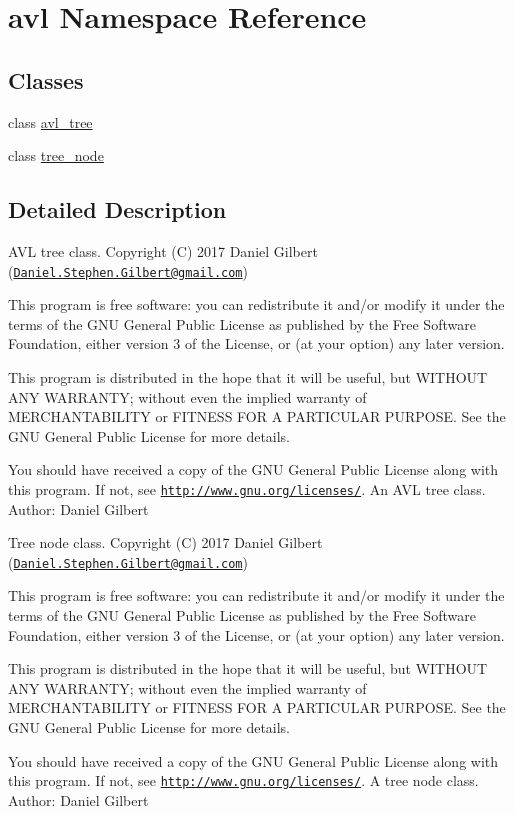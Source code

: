 \hypertarget{namespaceavl}{}\section{avl Namespace Reference}
\label{namespaceavl}
\subsection*{Classes}
\begin{DoxyCompactItemize}
\item 
class \hyperlink{classavl_1_1avl__tree}{avl\+\_\+tree}
\item 
class \hyperlink{classavl_1_1tree__node}{tree\+\_\+node}
\end{DoxyCompactItemize}


\subsection{Detailed Description}
A\+VL tree class. Copyright (C) 2017 Daniel Gilbert (\href{mailto:Daniel.Stephen.Gilbert@gmail.com}{\tt Daniel.\+Stephen.\+Gilbert@gmail.\+com})

This program is free software\+: you can redistribute it and/or modify it under the terms of the G\+NU General Public License as published by the Free Software Foundation, either version 3 of the License, or (at your option) any later version.

This program is distributed in the hope that it will be useful, but W\+I\+T\+H\+O\+UT A\+NY W\+A\+R\+R\+A\+N\+TY; without even the implied warranty of M\+E\+R\+C\+H\+A\+N\+T\+A\+B\+I\+L\+I\+TY or F\+I\+T\+N\+E\+SS F\+OR A P\+A\+R\+T\+I\+C\+U\+L\+AR P\+U\+R\+P\+O\+SE. See the G\+NU General Public License for more details.

You should have received a copy of the G\+NU General Public License along with this program. If not, see \href{http://www.gnu.org/licenses/}{\tt http\+://www.\+gnu.\+org/licenses/}. An A\+VL tree class. Author\+: Daniel Gilbert

Tree node class. Copyright (C) 2017 Daniel Gilbert (\href{mailto:Daniel.Stephen.Gilbert@gmail.com}{\tt Daniel.\+Stephen.\+Gilbert@gmail.\+com})

This program is free software\+: you can redistribute it and/or modify it under the terms of the G\+NU General Public License as published by the Free Software Foundation, either version 3 of the License, or (at your option) any later version.

This program is distributed in the hope that it will be useful, but W\+I\+T\+H\+O\+UT A\+NY W\+A\+R\+R\+A\+N\+TY; without even the implied warranty of M\+E\+R\+C\+H\+A\+N\+T\+A\+B\+I\+L\+I\+TY or F\+I\+T\+N\+E\+SS F\+OR A P\+A\+R\+T\+I\+C\+U\+L\+AR P\+U\+R\+P\+O\+SE. See the G\+NU General Public License for more details.

You should have received a copy of the G\+NU General Public License along with this program. If not, see \href{http://www.gnu.org/licenses/}{\tt http\+://www.\+gnu.\+org/licenses/}. A tree node class. Author\+: Daniel Gilbert 